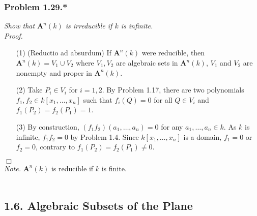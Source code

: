 \documentclass{article}
\begin{document}



\subsubsection*{Problem 1.29.*}
\emph{Show that $\mathbf{A}^n(k)$ is irreducible if $k$ is infinite.} \\

\emph{Proof.}
\begin{enumerate}
\item[(1)]
  (Reductio ad absurdum)
  If $\mathbf{A}^n(k)$ were reducible,
  then $\mathbf{A}^n(k) = V_1 \cup V_2$ where $V_1, V_2$ are algebraic sets in $\mathbf{A}^n(k)$,
  $V_1$ and $V_2$ are nonempty and proper in $\mathbf{A}^n(k)$.

\item[(2)]
  Take $P_i \in V_i$ for $i = 1, 2$.
  By Problem 1.17,
  there are two polynomials $f_1, f_2 \in k[x_1,\ldots,x_n]$
  such that $f_i(Q) = 0$ for all $Q \in V_i$ and $f_1(P_2) = f_2(P_1) = 1$.

\item[(3)]
  By construction,
  $(f_1 f_2)(a_1,\ldots,a_n) = 0$ for any $a_1,\ldots,a_n \in k$.
  As $k$ is infinite, $f_1 f_2 = 0$ by Problem 1.4.
  Since $k[x_1,\ldots,x_n]$ is a domain, $f_1 = 0$ or $f_2 = 0$,
  contrary to $f_1(P_2) = f_2(P_1) \neq 0$.
\end{enumerate}
$\Box$ \\

\emph{Note.}
  $\mathbf{A}^n(k)$ is reducible if $k$ is finite. \\\\






\subsection*{1.6. Algebraic Subsets of the Plane \\}
\end{document}
